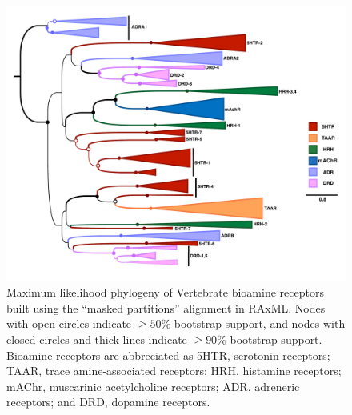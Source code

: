\documentclass[fleqn,10pt]{wlpeerj}
\begin{document}
\begin{figure}[htbp]
	\centerline{\includegraphics[width=18cm]{figures/masked_part_idraw.pdf}}
	\caption{\label{phylogeny} Maximum likelihood phylogeny of Vertebrate bioamine receptors built using the ``masked partitions'' alignment in RAxML. Nodes with open circles indicate $\geq 50\%$ bootstrap support, and nodes with closed circles and thick lines indicate $\geq 90\%$ bootstrap support. Bioamine receptors are abbreciated as 5HTR, serotonin receptors; TAAR, trace amine-associated receptors; HRH, histamine receptors; mAChr, muscarinic acetylcholine receptors; ADR, adreneric receptors; and DRD, dopamine receptors.}
\end{figure}
\end{document}
